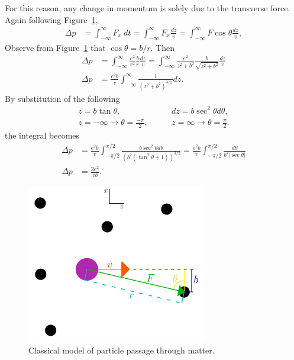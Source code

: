 \fi
For this reason, any change in momentum is solely due to the transverse force. Again following Figure~\ref{fig:bethe_bloch},
\begin{align*}
\Delta p &=\int_{-\infty} ^\infty F_x \ dt = \int_{-\infty} ^{\infty} F_x \frac{dz}{v} = \int_{-\infty} ^{\infty} F\cos{\theta}\frac{dz}{v},
\end{align*}
 Observe from Figure~\ref{fig:bethe_bloch} that $\cos\theta = b/r$. Then
\begin{align*}
\Delta p &= \int_{-\infty} ^{\infty} \frac{e^2}{r^2} \frac{b}{r} \frac{dz}{v} = \int_{-\infty} ^{\infty} \frac{e^2}{z^2+b^2} \frac{b}{\sqrt{z^2+b^2}} \frac{dz}{v}\\
\Delta p &= \frac{e^2 b}{v} \int_{-\infty} ^{\infty} \frac{1}{(z^2+b^2)^{3/2}}dz.
\end{align*}
By substitution of the following
\begin{align*}
z = b\tan{\theta},&\qquad dz = b\sec^2{\theta} d\theta,\\
z=-\infty\rightarrow \theta = \frac{-\pi}{2},&\qquad z=\infty \rightarrow \theta = \frac{\pi}{2}.
\end{align*}
the integral becomes
\begin{align*}
\Delta p &=\frac{e^2 b}{v}\int_{-\pi/2} ^{\pi/2} \frac{b\sec^2{\theta} d\theta}{(b^2(\tan^2{\theta}+1))^{3/2}} =\frac{e^2 b}{v}\int_{-\pi/2} ^{\pi/2} \frac{d\theta}{b^2 |\sec{\theta}|}\\
\Delta p&=\frac{2e^2}{vb}.
\end{align*}

\begin{figure}[h!]
  \centering
    \includegraphics[width=0.7\textwidth]{Figures/bethe_bloch} 
  \caption{Classical model of particle passage through matter.}
  \label{fig:bethe_bloch}
\end{figure}

